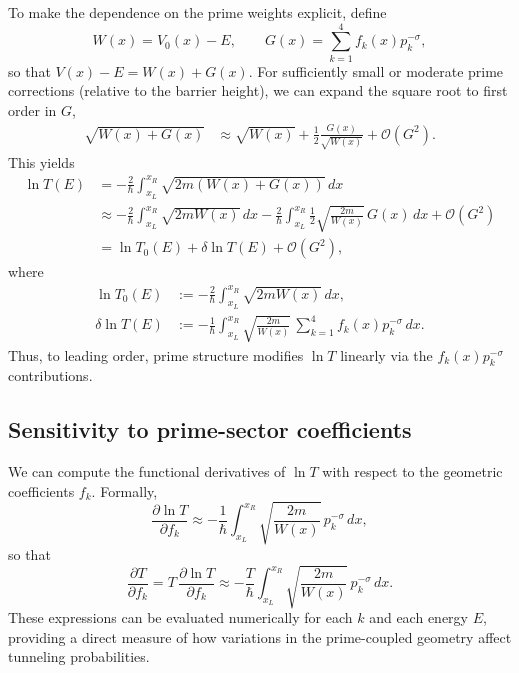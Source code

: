 \documentclass[11pt]{article}
\begin{document}
To make the dependence on the prime weights explicit, define
\begin{equation}
  W(x) = V_0(x) - E, \qquad
  G(x) = \sum_{k=1}^4 f_k(x)p_k^{-\sigma},
\end{equation}
so that \(V(x)-E = W(x) + G(x)\). For sufficiently small or moderate
prime corrections (relative to the barrier height), we can expand the
square root to first order in \(G\),
\begin{align}
  \sqrt{W(x)+G(x)} 
  &\approx \sqrt{W(x)} +
    \frac{1}{2}\frac{G(x)}{\sqrt{W(x)}} + \mathcal{O}(G^2).
\end{align}
This yields
\begin{align}
  \ln T(E)
  &= -\frac{2}{\hbar}\int_{x_L}^{x_R}
     \sqrt{2m\left(W(x)+G(x)\right)}\,dx \nonumber\\
  &\approx -\frac{2}{\hbar}\int_{x_L}^{x_R}
     \sqrt{2m W(x)}\,dx
     -\frac{2}{\hbar}\int_{x_L}^{x_R}
     \frac{1}{2}\sqrt{\frac{2m}{W(x)}}\,G(x)\,dx
     + \mathcal{O}(G^2)\nonumber\\
  &= \ln T_0(E) +
     \delta \ln T(E) + \mathcal{O}(G^2),
\end{align}
where
\begin{align}
  \ln T_0(E)
  &:= -\frac{2}{\hbar}\int_{x_L}^{x_R}
      \sqrt{2m W(x)}\,dx,
  \\
  \delta \ln T(E)
  &:= -\frac{1}{\hbar}
      \int_{x_L}^{x_R}
      \sqrt{\frac{2m}{W(x)}}\,
      \sum_{k=1}^{4} f_k(x)p_k^{-\sigma}\,dx.
\end{align}
Thus, to leading order, prime structure modifies \(\ln T\) linearly via
the \(f_k(x)p_k^{-\sigma}\) contributions.

\subsection{Sensitivity to prime-sector coefficients}

We can compute the functional derivatives of \(\ln T\) with respect to
the geometric coefficients \(f_k\). Formally,
\begin{equation}
  \frac{\partial \ln T}{\partial f_k}
  \approx
  -\frac{1}{\hbar}
  \int_{x_L}^{x_R}
  \sqrt{\frac{2m}{W(x)}}\,p_k^{-\sigma}\,dx,
  \label{eq:dlnT_dfk}
\end{equation}
so that
\begin{equation}
  \frac{\partial T}{\partial f_k}
  = T\,\frac{\partial \ln T}{\partial f_k}
  \approx
  -\frac{T}{\hbar}
  \int_{x_L}^{x_R}
  \sqrt{\frac{2m}{W(x)}}\,p_k^{-\sigma}\,dx.
  \label{eq:dT_dfk}
\end{equation}
These expressions can be evaluated numerically for each \(k\) and each
energy \(E\), providing a direct measure of how variations in the
prime-coupled geometry affect tunneling probabilities.
\end{document}
